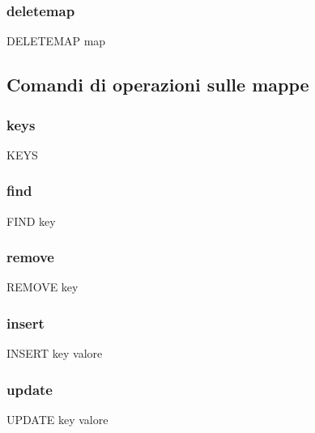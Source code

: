 \documentclass[a4paper]{article}
\begin{document}
			\subsubsection{deletemap}
			\begin{center}
				DELETEMAP map
			\end{center}
		\subsection{Comandi di operazioni sulle mappe}
			\subsubsection{keys}
			\begin{center}
				KEYS
			\end{center}
			\subsubsection{find}
			\begin{center}
				FIND key
			\end{center}
			\subsubsection{remove}
			\begin{center}
				REMOVE key
			\end{center}
			\subsubsection{insert}
			\begin{center}
				INSERT key valore
			\end{center}
			\subsubsection{update}
			\begin{center}
				UPDATE key valore
			\end{center}
			
	\cleardoublepage
	\listoffigures
	
	\cleardoublepage
	\listoftables
		
\end{document}
